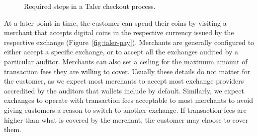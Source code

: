 \documentclass{llncs}
\begin{document}
\begin{figure}[p!]
   \hfill
{} \hfill
{}
\caption{Required steps in a Taler checkout process.}
\label{fig:shopping}
\end{figure}


At a later point in time, the customer can spend their coins by
visiting a merchant that accepts digital coins in the respective
currency issued by the respective exchange
(Figure~\ref{fig:taler-pay}).  Merchants are generally configured to
either accept a specific exchange, or to accept all the exchanges
audited by a particular auditor.  Merchants can also set a ceiling for
the maximum amount of transaction fees they are willing to cover.
Usually these details do not matter for the customer, as we expect
most merchants to accept most exchange providers accredited by the
auditors that wallets include by default.  Similarly, we expect
exchanges to operate with transaction fees acceptable to most
merchants to avoid giving customers a reason to switch to another
exchange.  If transaction fees are higher than what is covered by the
merchant, the customer may choose to cover them.
\end{document}
